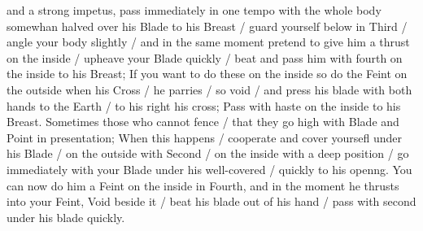 \newpage


\newpage


and a strong impetus, pass immediately in one tempo with the whole
body somewhan halved over his Blade to his Breast / guard yourself
below in Third / angle your body slightly / and in the same moment
pretend to give him a thrust on the inside / upheave
your Blade quickly / beat and pass him with fourth on the inside to
his Breast; If you want to do these on the inside so do the Feint on
the outside when his Cross / he parries / so void / and press his
blade with both hands to the Earth / to his right his cross; Pass with
haste on the inside to his Breast. Sometimes those who cannot fence /
that they go high with Blade and Point in presentation; When this
happens / cooperate and cover yoursefl under his Blade / on the
outside with Second / on the inside with a deep position / go
immediately with your Blade under his well-covered / quickly to his
openng. You can now do him a Feint on the inside in Fourth, and in the
moment he thrusts into your Feint, Void beside it  / beat his blade
out of his hand / pass with second under his blade quickly.


